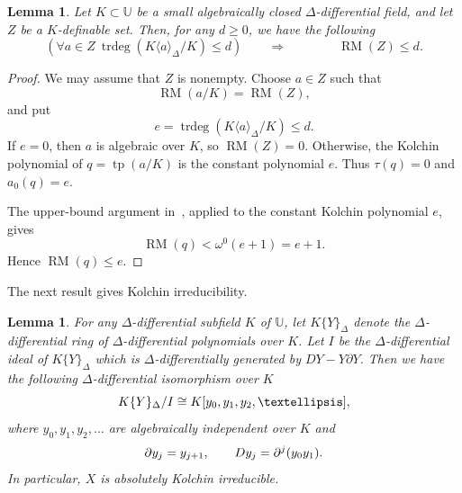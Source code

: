 \documentclass[10pt,a4paper]{amsart}
\newtheorem{lemma}[theorem]{Lemma}
\newcommand{\RM}{\operatorname{RM}}
\newcommand{\tp}{\operatorname{tp}}
\newcommand{\trdeg}{\operatorname{trdeg}}
\newcommand{\Uu}{{\mathds{U}}}
\begin{document}
\begin{lemma}\label{finite-dimensional-bound}
Let $K\subset \Uu$ be a small algebraically closed $\Delta$-differential field,
and let $Z$ be a $K$-definable set. Then, for any $d\geqslant0$, we have the following
\[
\left(\forall a\in Z \ \trdeg(K\langle a\rangle_\Delta/K)\leqslant d\right)\qquad \Longrightarrow\qquad
\qquad \RM(Z)\leqslant d.
\]
\end{lemma}
\begin{proof}
We may assume that $Z$ is nonempty. Choose $a\in Z$
such that
\[
\RM(a/K)=\RM(Z),
\]
and put
\[
e=\trdeg(K\langle a\rangle_\Delta/K)\leqslant d.
\]
If $e=0$, then $a$ is algebraic over $K$, so
$\RM(Z)=0$. Otherwise, the Kolchin polynomial of
$q=\tp(a/K)$ is the constant polynomial $e$.
Thus $\tau(q)=0$ and $a_0(q)=e$.

The upper-bound argument in~\cite[Lemma~5.2.6 and
Proposition~4.2.9]{McGrail}, applied to the constant
Kolchin polynomial $e$, gives
\[
\RM(q)<\omega^0(e+1)=e+1.
\]
Hence $\RM(q)\leqslant e$.
\end{proof}
The next result gives Kolchin irreducibility.
\begin{lemma}\label{irred}
For any $\Delta$-differential subfield $K$ of $\Uu$, let $K\{Y\}_{\Delta}$ denote the $\Delta$-differential ring of $\Delta$-differential polynomials over $K$. Let $I$ be the $\Delta$-differential ideal of $K\{Y\}_{\Delta}$ which is $\Delta$-differentially generated by $DY-Y\partial Y$. Then we have the following $\Delta$-differential isomorphism over $K$
\begin{equation}\label{coordinate-ring}
 K\{Y\}_\Delta/I
 \cong K[y_0,y_1,y_2,\ldots],
 \notag
\end{equation}
where $y_0,y_1,y_2,\ldots$ are algebraically independent over $K$ and
\begin{equation}\label{jet-actions}
 \partial y_j=y_{j+1},\qquad
 Dy_j=\partial^j(y_0y_1).
\notag
\end{equation}
In particular, $X$ is absolutely Kolchin irreducible.
\end{lemma}
\end{document}
